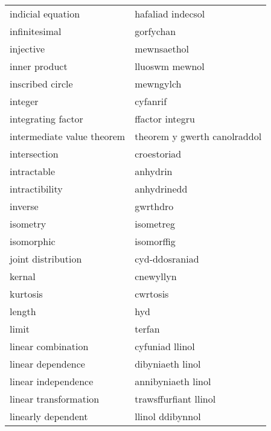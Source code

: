 \begin{supertabular}{p{0.22\textwidth}p{0.22\textwidth}}
                indicial equation &                hafaliad indecsol \\
                    infinitesimal &                        gorfychan \\
                        injective &                      mewnsaethol \\
                    inner product &                   lluoswm mewnol \\
                 inscribed circle &                        mewngylch \\
                          integer &                         cyfanrif \\
               integrating factor &                  ffactor integru \\
       intermediate value theorem &     theorem y gwerth canolraddol \\
                     intersection &                      croestoriad \\
                      intractable &                         anhydrin \\
                   intractibility &                      anhydrinedd \\
                          inverse &                         gwrthdro \\
                         isometry &                        isometreg \\
                       isomorphic &                       isomorffig \\
               joint distribution &                   cyd-ddosraniad \\
                           kernal &                        cnewyllyn \\
                         kurtosis &                         cwrtosis \\
                           length &                              hyd \\
                            limit &                           terfan \\
               linear combination &                  cyfuniad llinol \\
                linear dependence &                 dibyniaeth linol \\
              linear independence &               annibyniaeth linol \\
            linear transformation &            trawsffurfiant llinol \\
               linearly dependent &                 llinol ddibynnol \\

\end{supertabular}
